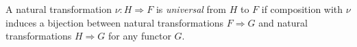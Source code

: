 A natural transformation $\nu: H \Rightarrow F$ is \emph{universal} from $H$ to $F$ if composition with $\nu$ induces a bijection between natural transformations $F \Rightarrow G$ and natural transformations $H \Rightarrow G$ for any functor $G$.

